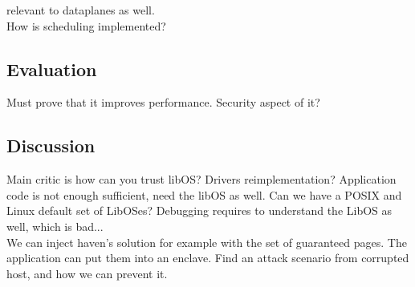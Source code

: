 relevant to dataplanes as well.\\

How is scheduling implemented?

\subsection{Evaluation}

Must prove that it improves performance.
Security aspect of it?

\subsection{Discussion}
Main critic is how can you trust libOS?
Drivers reimplementation?
Application code is not enough sufficient, need the libOS as well.
Can we have a POSIX and Linux default set of LibOSes?
Debugging requires to understand the LibOS as well, which is bad...
\\

We can inject haven's solution for example with the set of guaranteed pages.
The application can put them into an enclave.
Find an attack scenario from corrupted host, and how we can prevent it.\\
